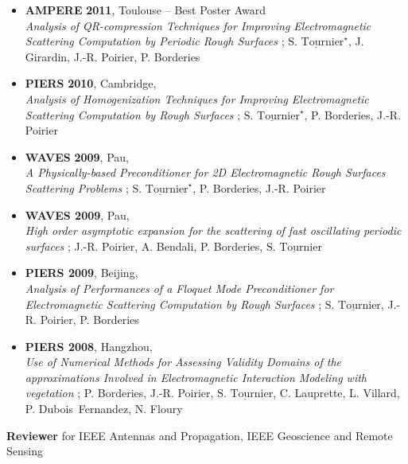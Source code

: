 \documentclass[a4paper,10pt,twoside]{article}
\newcommand\moi{$\underline{\textrm{S. Tournier}}$}
\newcommand\moistar{$\underline{\textrm{S. Tournier}}^\star$}
\begin{document}
\begin{itemize}
\item[\textbullet]
  \textbf{AMPERE}
  \textbf{2011}, Toulouse
  -- \textsf{Best Poster Award}\\
  \emph{Analysis of QR-compression
    Techniques for Improving Electromagnetic Scattering Computation by
    Periodic Rough Surfaces} ;
  \moistar, J. Girardin, J.-R. Poirier, P. Borderies

\item[\textbullet]
  \textbf{PIERS}
  \textbf{2010}, Cambridge, \\
  \emph{Analysis of Homogenization Techniques for Improving
    Electromagnetic Scattering Computation by Rough Surfaces} ;
  \moistar, P. Borderies, J.-R. Poirier

\item[\textbullet]
  \textbf{WAVES}
  \textbf{2009}, Pau,\\
  \emph{A Physically-based Preconditioner for 2D Electromagnetic Rough
    Surfaces Scattering Problems} ;
  \moistar, P. Borderies, J.-R. Poirier

\item[\textbullet]
  \textbf{WAVES 2009}, Pau,\\
  \emph{High order asymptotic expansion for the scattering of fast
    oscillating periodic surfaces} ;
  J.-R. Poirier, A. Bendali, P. Borderies,  \moi

\item[\textbullet]
  \textbf{PIERS 2009}, Beijing,\\
  \emph{Analysis of Performances of a Floquet Mode Preconditioner for
    Electromagnetic Scattering Computation by Rough Surfaces} ;
  \moi, J.-R. Poirier, P. Borderies

\item[\textbullet]
  \textbf{PIERS 2008}, Hangzhou,\\
  \emph{Use of Numerical Methods for Assessing Validity Domains of the
    approximations Involved in Electromagnetic Interaction Modeling
    with vegetation} ;
  P. Borderies, J.-R. Poirier, \moi, C. Lauprette, L. Villard, P. Dubois~Fernandez, N. Floury
\end{itemize}

\vspace{0.1cm}

\noindent
\textbf{Reviewer} for
IEEE Antennas and Propagation,
IEEE Geoscience and Remote Sensing
\end{document}
